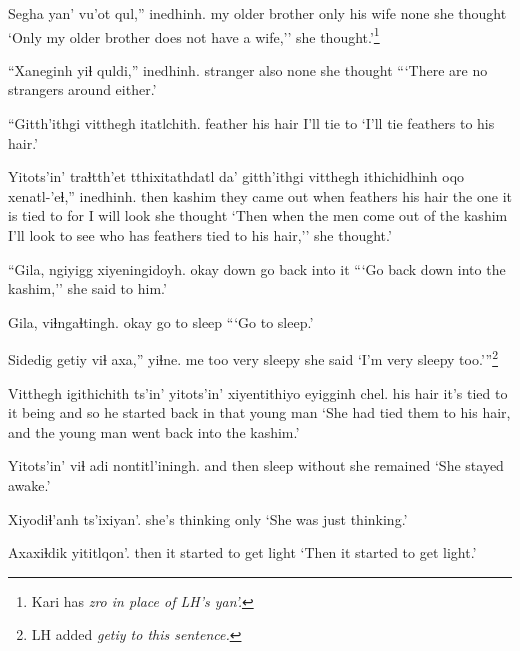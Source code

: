 \documentclass[12pt]{article}
\begin{document}
\gll Segha   yan' vu'ot  qul,'' inedhinh.
{my older brother} only {his wife} none {she thought}
\glt `Only my older brother does not have a wife,'' she thought.'\footnote{Kari has \em zro \em in place of LH's \em yan'.}
\glend

\gll ``Xaneginh yiɬ quldi,'' inedhinh.
stranger also none {she thought}
\glt ```There are no strangers around either.'
\glend

\gll ``Gitth'ithgi  vitthegh itatlchith.
feather  {his hair} {I'll tie to}
\glt `I'll tie feathers to his hair.'
\glend

\gll Yitots'in' traɬtth'et tthixitathdatl da' gitth'ithgi vitthegh ithichidhinh oqo xenatl-'eɬ,'' inedhinh.
then  kashim  {they came out}  when feathers {his hair} {the one it is tied to} for {I will look} {she thought}
\glt `Then when the men come out of the kashim I'll look to see who has feathers tied to his hair,'' she thought.'
\glend

\gll ``Gila, ngiyigg xiyeningidoyh.
okay down {go back into it}
\glt ```Go back down into the kashim,'' she said to him.'
\glend

\gll Gila, viɬngaɬtingh.
okay {go to sleep}
\glt ```Go to sleep.'
\glend

\gll Sidedig getiy {viɬ axa,''} yiɬne.
{me too} very sleepy {she said}
\glt `I'm very sleepy too.'''\footnote{LH added \em getiy \em to this sentence.}
\glend

\gll Vitthegh igithichith ts'in' yitots'in' xiyentithiyo  eyigginh chel.
{his hair} {it's tied to it} being {and so} {he started back in} that {young man}
\glt `She had tied them to his hair, and the young man went back into the kashim.'
\glend

\gll Yitots'in' viɬ adi  nontitl'iningh.
{and then} sleep without {she remained}
\glt `She stayed awake.'
\glend

\gll Xiyodiɬ'anh ts'ixiyan'.
{she's thinking} only
\glt `She was just thinking.'
\glend

\gll Axaxiɬdik yititlqon'.
then  {it started to get light}
\glt `Then it started to get light.'
\glend
\end{document}
